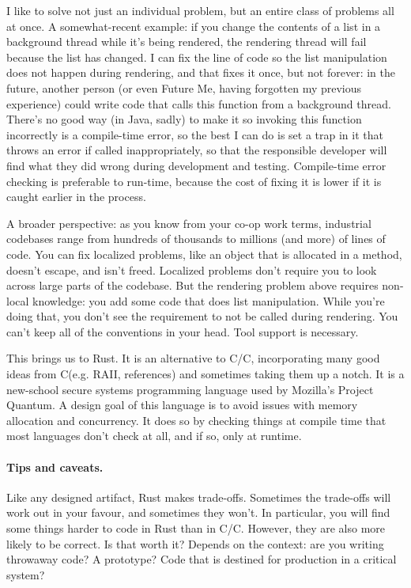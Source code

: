 \documentclass[a4paper]{report}
\newcommand{\CPP}{C\nolinebreak\hspace{-.05em}\raisebox{.4ex}{\tiny\bf +}\nolinebreak\hspace{-.10em}\raisebox{.4ex}{\tiny\bf +}}
\def\CPP{{C\nolinebreak[4]\hspace{-.05em}\raisebox{.4ex}{\tiny\bf ++}}}
\begin{document}
I like to solve not just an individual problem, but an entire class of problems all at once. A somewhat-recent example: if you change the contents of a list in a background thread while it's being rendered, the rendering thread will fail because the list has changed. I can fix the line of code so the list manipulation does not happen during rendering, and that fixes it once, but not forever: in the future, another person (or even Future Me, having forgotten my previous experience) could write code that calls this function from a background thread. There's no good way (in Java, sadly) to make it so invoking this function incorrectly is a compile-time error, so the best I can do is set a trap in it that throws an error if called inappropriately, so that the responsible developer will find what they did wrong during development and testing. Compile-time error checking is preferable to run-time, because the cost of fixing it is lower if it is caught earlier in the process.

A broader perspective: as you know from your co-op work terms, industrial codebases range from hundreds of thousands to millions (and more) of lines of code. You can fix localized problems, like an object that is allocated in a method, doesn't escape, and isn't freed. Localized problems don't require you to look across large parts of the codebase. But the rendering problem above requires non-local knowledge: you add some code that does list manipulation. While you're doing that, you don't see the requirement to not be called during rendering. You can't keep all of the conventions in your head. Tool support is necessary.

This brings us to Rust. It is an alternative to C/\CPP, incorporating many good ideas from \CPP (e.g. RAII, references) and sometimes taking them up a notch. It is a new-school
secure systems programming language used by Mozilla's Project Quantum. A design goal of this language is to avoid issues with memory allocation and concurrency. It does so by checking things at compile time that most languages don't check at all, and if so, only at runtime.

\paragraph{Tips and caveats.}
Like any designed artifact, Rust makes trade-offs. Sometimes the trade-offs will work out in your favour, and sometimes they won't. In particular, you will find some things harder to code in Rust than in C/\CPP. However, they are also more likely to be correct. Is that worth it? Depends on the context: are you writing throwaway code? A prototype? Code that is destined for production in a critical system?
\end{document}
